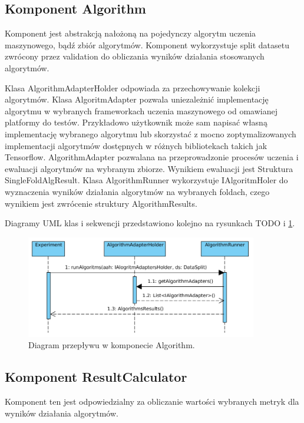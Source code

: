 \documentclass[12pt]{article}
\begin{document}
\subsection{Komponent Algorithm}

Komponent jest abstrakcją nałożoną na pojedynczy algorytm uczenia maszynowego, bądź zbiór algorytmów. Komponent wykorzystuje split datasetu zwrócony przez validation do obliczania wyników działania stosowanych algorytmów. 
 
Klasa AlgorithmAdapterHolder odpowiada za przechowywanie kolekcji algorytmów. Klasa AlgoritmAdapter pozwala uniezależnić implementację algorytmu w wybranych frameworkach uczenia maszynowego od omawianej platformy do testów. Przykładowo użytkownik może sam napisać własną implementację wybranego algorytmu lub skorzystać z mocno zoptymalizowanych implementacji algorytmów dostępnych w różnych bibliotekach takich jak Tensorflow. AlgorithmAdapter pozwalana na przeprowadzonie procesów uczenia i ewaluacji algorytmów na wybranym zbiorze. Wynikiem ewaluacji jest Struktura SingleFoldAlgResult. Klasa AlgorithmRunner wykorzystuje IAlgoritmHoler do wyznaczenia wyników działania algorytmów na wybranych foldach, czego wynikiem jest zwrócenie struktury AlgorithmResults.

Diagramy UML klas i sekwencji przedstawiono kolejno na rysunkach TODO i \ref{fig:sequenceAlgorithm}.

\begin{figure}
	\centering
	\includegraphics[width=0.9\textwidth]{img/sequenceAlgorithm.png}
	\caption{Diagram przepływu w komponecie Algorithm.}
	\label{fig:sequenceAlgorithm}
\end{figure}

\subsection{Komponent ResultCalculator}

Komponent ten jest odpowiedzialny za obliczanie wartości wybranych metryk dla wyników działania algorytmów.
\end{document}
